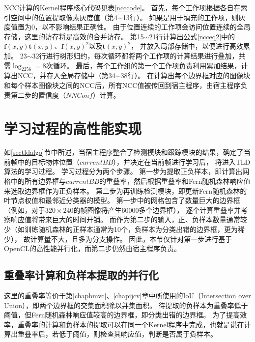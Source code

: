 NCC计算的Kernel程序核心代码见表\ref{ncccode}。
首先，每个工作项根据各自在索引空间中的位置提取像素灰度值（第4$\sim$13行）。
如果是用于填充的工作项，则灰度值置为0，以不影响结果正确性。
由于位置连续的工作项会访问位置连续的全局存储，这里的访存将是高效的合并访存。
第15$\sim$21行计算出公式\ref{ncceq2}中的$\mathbf{f}(x, y)\mathbf{t}(x, y) $、$\mathbf{f}(x, y)^2$以及$\mathbf{t}(x, y)^2$，
并放入局部存储中，以便进行高效累加。
23$\sim$32行进行树形归约，每次循环都将两个工作项的计算结果进行叠加，共需$\log_2256=8$次循环。
最后，每个工作组的第一个工作项负责利用累加结果，计算出NCC，并存入全局存储中（第34$\sim$38行）。
在计算出每个边界框对应的图像块和每个样本图像块之间的NCC后，所有NCC值被传回到宿主程序，由宿主程序负责第二步的置信度（$NNConf$）计算。

\section{学习过程的高性能实现}
\label{learnalgosec}
如\ref{sectldalgo}节中所述，当宿主程序整合了检测模块和跟踪模块的结果，确定了当前帧中的目标物体位置（$currentBB$），并决定在当前帧进行学习后，
将进入TLD算法的学习过程。
学习过程分为两个步骤。
第一步为提取正负样本，即计算出网格中的所有边界框与$currentBB$的重叠率，然后根据重叠率和Fern随机森林响应值来选取边界框作为正负样本。
第二步为再训练检测模块，即更新Fern随机森林的叶节点权值和最邻近分类器的模型。
第一步中的网格包含了数量巨大的边界框（例如，对于$320\times240$的帧图像将产生60000多个边界框），
逐个计算重叠率并考察响应值将带来巨大的时间开销。
而作为第二步的输入，正、负样本数量通常较少（如训练随机森林的正样本通常为10个，负样本为分类出错的边界框，更为稀少），
故计算量不大，且多为分支操作。
因此，本节仅针对第一步进行基于OpenCL的高性能并行化，而第二步仍然由宿主程序负责。

\subsection{重叠率计算和负样本提取的并行化}
这里的重叠率等价于第\ref{chapbmvc}、\ref{chapijcv}章中所使用的IoU（Intersection over Union），即两个边界框的交集面积除以并集面积。
待提取的负样本为重叠率低于阈值，但Fern随机森林响应值较高的边界框，即分类出错的边界框。
为了提高效率，重叠率的计算和负样本的提取可以在同一个Kernel程序中完成，也就是说在计算出重叠率后，若低于阈值，则检查其响应值，判断是否属于负样本。

